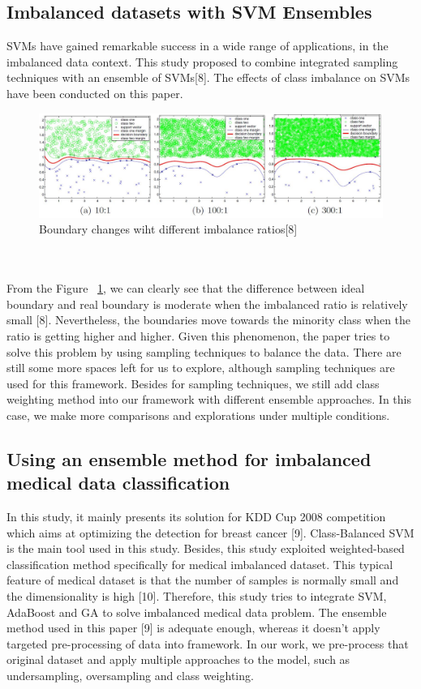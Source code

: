 \documentclass{article}
\begin{document}
\subsection{Imbalanced datasets with SVM Ensembles}
SVMs have gained remarkable success in a wide range of applications, in the imbalanced data context. This study proposed to combine integrated sampling techniques with an ensemble of SVMs[8]. The effects of class imbalance on SVMs have been conducted on this paper.
\begin{figure}
  \centering
  \includegraphics[width=\linewidth]{../fig/imbalanced_data.JPG}
  \caption{Boundary changes wiht different imbalance ratios[8]}
  \label{Boundary}
\end{figure}
\\\\From the Figure ~\ref{Boundary}, we can clearly see that the difference between ideal boundary and real boundary is moderate when the imbalanced ratio is relatively small [8]. Nevertheless, the boundaries move towards the minority class when the ratio is getting higher and higher. Given this phenomenon, the paper tries to solve this problem by using sampling techniques to balance the data.
There are still some more spaces left for us to explore, although sampling techniques are used for this framework. Besides for sampling techniques, we still add class weighting method into our framework with different ensemble approaches. In this case, we make more comparisons and explorations under multiple conditions.

\subsection{Using an ensemble method for imbalanced medical data classification}
In this study, it mainly presents its solution for KDD Cup 2008 competition which aims at optimizing the detection for breast cancer [9]. Class-Balanced SVM is the main tool used in this study. Besides, this study exploited weighted-based classification method specifically for medical imbalanced dataset. This typical feature of medical dataset is that the number of samples is normally small and the dimensionality is high [10]. Therefore, this study tries to integrate SVM, AdaBoost and GA to solve imbalanced medical data problem. The ensemble method used in this paper [9] is adequate enough, whereas it doesn’t apply targeted pre-processing of data into framework. In our work, we pre-process that original dataset and apply multiple approaches to the model, such as undersampling, oversampling and class weighting.
\end{document}
